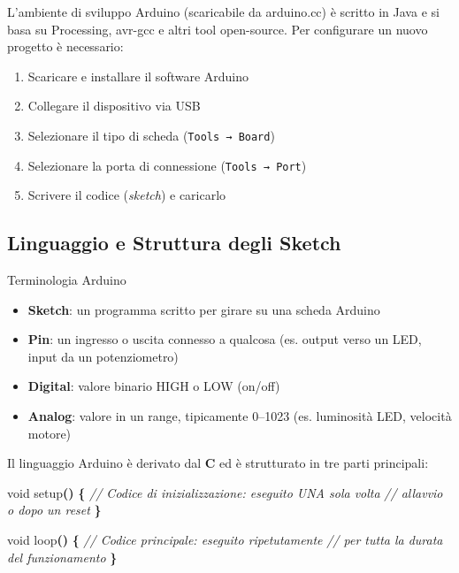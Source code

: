 \documentclass[
  italian,
  openany]{book}
\newenvironment{Shaded}{\begin{snugshade}}{\end{snugshade}}
\newcommand{\CommentTok}[1]{\textcolor[rgb]{0.56,0.35,0.01}{\textit{#1}}}
\newcommand{\DataTypeTok}[1]{\textcolor[rgb]{0.13,0.29,0.53}{#1}}
\newcommand{\NormalTok}[1]{#1}
\newcommand{\OperatorTok}[1]{\textcolor[rgb]{0.81,0.36,0.00}{\textbf{#1}}}
\providecommand{\tightlist}{%
  \setlength{\itemsep}{0pt}\setlength{\parskip}{0pt}}
\begin{document}
L'ambiente di sviluppo Arduino (scaricabile da arduino.cc) è scritto in
Java e si basa su Processing, avr-gcc e altri tool open-source. Per
configurare un nuovo progetto è necessario:

\begin{enumerate}
\def\labelenumi{\arabic{enumi}.}
\tightlist
\item
  Scaricare e installare il software Arduino
\item
  Collegare il dispositivo via USB
\item
  Selezionare il tipo di scheda (\texttt{Tools\ →\ Board})
\item
  Selezionare la porta di connessione (\texttt{Tools\ →\ Port})
\item
  Scrivere il codice (\emph{sketch}) e caricarlo
\end{enumerate}

\subsection{Linguaggio e Struttura degli
Sketch}\label{linguaggio-e-struttura-degli-sketch}

\begin{calloutdefinition}{Terminologia Arduino}

\begin{itemize}
\tightlist
\item
  \textbf{Sketch}: un programma scritto per girare su una scheda Arduino
\item
  \textbf{Pin}: un ingresso o uscita connesso a qualcosa (es. output
  verso un LED, input da un potenziometro)
\item
  \textbf{Digital}: valore binario HIGH o LOW (on/off)
\item
  \textbf{Analog}: valore in un range, tipicamente 0--1023 (es.
  luminosità LED, velocità motore)
\end{itemize}

\end{calloutdefinition}

Il linguaggio Arduino è derivato dal \textbf{C} ed è strutturato in tre
parti principali:

\begin{Shaded}
\begin{Highlighting}[]
\DataTypeTok{void}\NormalTok{ setup}\OperatorTok{()} \OperatorTok{\{}
  \CommentTok{// Codice di inizializzazione: eseguito UNA sola volta}
  \CommentTok{// all\textquotesingle{}avvio o dopo un reset}
\OperatorTok{\}}

\DataTypeTok{void}\NormalTok{ loop}\OperatorTok{()} \OperatorTok{\{}
  \CommentTok{// Codice principale: eseguito ripetutamente}
  \CommentTok{// per tutta la durata del funzionamento}
\OperatorTok{\}}
\end{Highlighting}
\end{Shaded}
\end{document}
